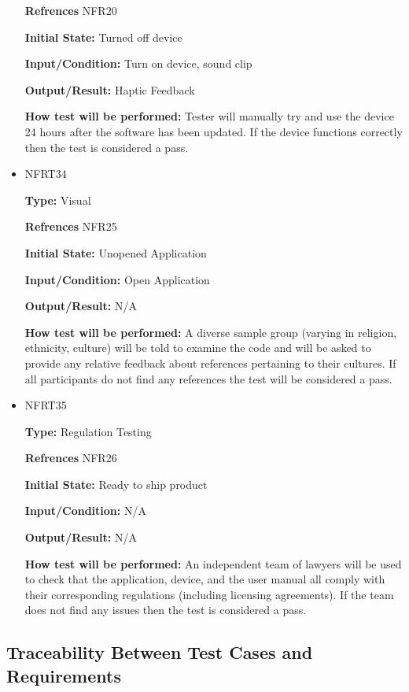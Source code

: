 \documentclass[12pt, titlepage]{article}
\begin{document}
\begin{itemize}
\textbf{Refrences} NFR20
					
\textbf{Initial State:} Turned off device
					
\textbf{Input/Condition:} Turn on device, sound clip
					
\textbf{Output/Result:} Haptic Feedback
					
\textbf{How test will be performed:} Tester will manually try and use the device 24 hours after the software has been updated. If the device functions correctly then the test is considered a pass.

\item{NFRT34}

\textbf{Type:} Visual

\textbf{Refrences} NFR25
					
\textbf{Initial State:} Unopened Application
					
\textbf{Input/Condition:} Open Application
					
\textbf{Output/Result:} N/A
					
\textbf{How test will be performed:} A diverse sample group (varying in religion, ethnicity, culture) will be told to examine the code and will be asked to provide any relative feedback about references pertaining to their cultures. If all participants do not find any references the test will be considered a pass. 

\item{NFRT35}

\textbf{Type:} Regulation Testing

\textbf{Refrences} NFR26
					
\textbf{Initial State:} Ready to ship product
					
\textbf{Input/Condition:} N/A
					
\textbf{Output/Result:} N/A
					
\textbf{How test will be performed:} An independent team of lawyers will be used to check that the application, device, and the user manual all comply with their corresponding regulations (including licensing agreements). If the team does not find any issues then the test is considered a pass.





\end{itemize}

\newpage
\subsection{Traceability Between Test Cases and Requirements}
\end{document}
